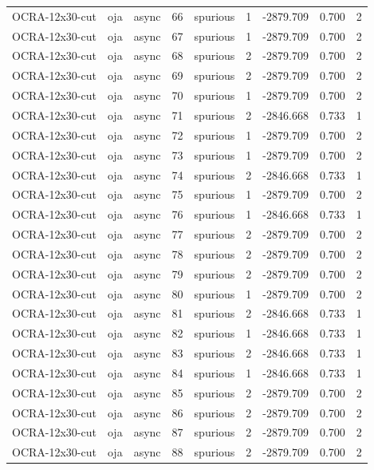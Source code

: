 \begin{tabular}{lllrlrrrr}
OCRA-12x30-cut & oja & async & 66 & spurious & 1 & -2879.709 & 0.700 & 2 \\
OCRA-12x30-cut & oja & async & 67 & spurious & 1 & -2879.709 & 0.700 & 2 \\
OCRA-12x30-cut & oja & async & 68 & spurious & 2 & -2879.709 & 0.700 & 2 \\
OCRA-12x30-cut & oja & async & 69 & spurious & 2 & -2879.709 & 0.700 & 2 \\
OCRA-12x30-cut & oja & async & 70 & spurious & 1 & -2879.709 & 0.700 & 2 \\
OCRA-12x30-cut & oja & async & 71 & spurious & 2 & -2846.668 & 0.733 & 1 \\
OCRA-12x30-cut & oja & async & 72 & spurious & 1 & -2879.709 & 0.700 & 2 \\
OCRA-12x30-cut & oja & async & 73 & spurious & 1 & -2879.709 & 0.700 & 2 \\
OCRA-12x30-cut & oja & async & 74 & spurious & 2 & -2846.668 & 0.733 & 1 \\
OCRA-12x30-cut & oja & async & 75 & spurious & 1 & -2879.709 & 0.700 & 2 \\
OCRA-12x30-cut & oja & async & 76 & spurious & 1 & -2846.668 & 0.733 & 1 \\
OCRA-12x30-cut & oja & async & 77 & spurious & 2 & -2879.709 & 0.700 & 2 \\
OCRA-12x30-cut & oja & async & 78 & spurious & 2 & -2879.709 & 0.700 & 2 \\
OCRA-12x30-cut & oja & async & 79 & spurious & 2 & -2879.709 & 0.700 & 2 \\
OCRA-12x30-cut & oja & async & 80 & spurious & 1 & -2879.709 & 0.700 & 2 \\
OCRA-12x30-cut & oja & async & 81 & spurious & 2 & -2846.668 & 0.733 & 1 \\
OCRA-12x30-cut & oja & async & 82 & spurious & 1 & -2846.668 & 0.733 & 1 \\
OCRA-12x30-cut & oja & async & 83 & spurious & 2 & -2846.668 & 0.733 & 1 \\
OCRA-12x30-cut & oja & async & 84 & spurious & 1 & -2846.668 & 0.733 & 1 \\
OCRA-12x30-cut & oja & async & 85 & spurious & 2 & -2879.709 & 0.700 & 2 \\
OCRA-12x30-cut & oja & async & 86 & spurious & 2 & -2879.709 & 0.700 & 2 \\
OCRA-12x30-cut & oja & async & 87 & spurious & 2 & -2879.709 & 0.700 & 2 \\
OCRA-12x30-cut & oja & async & 88 & spurious & 2 & -2879.709 & 0.700 & 2 \\

\end{tabular}
